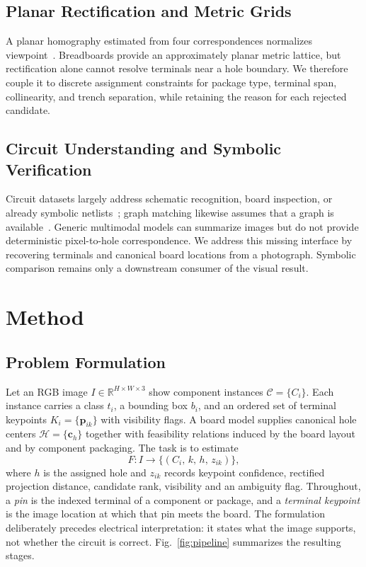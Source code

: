 \documentclass[conference]{IEEEtran}
\begin{document}
\subsection{Planar Rectification and Metric Grids}

A planar homography estimated from four correspondences normalizes
viewpoint~\cite{hartley}. Breadboards provide an approximately planar metric
lattice, but rectification alone cannot resolve terminals near a hole boundary.
We therefore couple it to discrete assignment constraints for package type,
terminal span, collinearity, and trench separation, while retaining the reason
for each rejected candidate.

\subsection{Circuit Understanding and Symbolic Verification}

Circuit datasets largely address schematic recognition, board inspection, or
already symbolic netlists~\cite{amsnet}; graph matching likewise assumes that a
graph is available~\cite{vf2}. Generic multimodal models can summarize images but
do not provide deterministic pixel-to-hole correspondence. We address this
missing interface by recovering terminals and canonical board locations from a
photograph. Symbolic comparison remains only a downstream consumer of the visual
result.

\section{Method}

\subsection{Problem Formulation}

Let an RGB image $I \in \mathbb{R}^{H \times W \times 3}$ show component
instances $\mathcal{C}=\{C_i\}$. Each instance carries a class $t_i$, a
bounding box $b_i$, and an ordered set of terminal keypoints
$K_i=\{\mathbf{p}_{ik}\}$ with visibility flags. A board model supplies canonical
hole centers $\mathcal{H}=\{\mathbf{c}_h\}$ together with feasibility relations
induced by the board layout and by component packaging. The task is to estimate
\begin{equation}
F: I \longrightarrow \{(C_i,\, k,\, h,\, z_{ik})\},
\label{eq:task}
\end{equation}
where $h$ is the assigned hole and $z_{ik}$ records keypoint confidence,
rectified projection distance, candidate rank, visibility and an ambiguity flag.
Throughout, a \emph{pin} is the indexed terminal of a component or package, and a
\emph{terminal keypoint} is the image location at which that pin meets the
board.
The formulation deliberately precedes electrical interpretation: it states what
the image supports, not whether the circuit is correct. Fig.~\ref{fig:pipeline}
summarizes the resulting stages.
\end{document}
